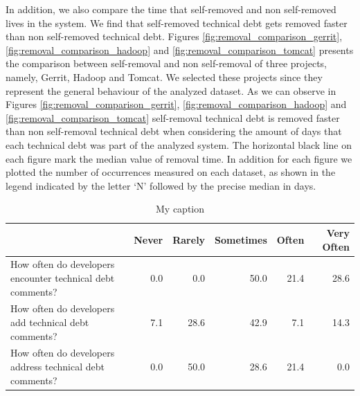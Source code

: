 In addition, we also compare the time that self-removed and non self-removed \SATD lives in the system. We find that self-removed technical debt gets removed faster than non self-removed technical debt. Figures \ref{fig:removal_comparison_gerrit}, \ref{fig:removal_comparison_hadoop} and \ref{fig:removal_comparison_tomcat} presents the comparison between self-removal and non self-removal of three projects, namely, Gerrit, Hadoop and Tomcat. We selected these projects since they represent the general behaviour of the analyzed dataset. As we can observe in Figures \ref{fig:removal_comparison_gerrit}, \ref{fig:removal_comparison_hadoop} and \ref{fig:removal_comparison_tomcat} self-removal technical debt is removed faster than non self-removal technical debt when considering the amount of days that each technical debt was part of the analyzed system. The horizontal black line on each figure mark the median value of removal time. In addition for each figure we plotted the number of occurrences measured on each dataset, as shown in the legend indicated by the letter `N' followed by the precise median in days.




\begin{table}[]
	\centering
	\caption{My caption}
	\label{my-label}
	\begin{tabular}{@{}lrrrrr@{}}
		\toprule
		\textbf{} & \textbf{Never} & \textbf{Rarely} & \textbf{Sometimes} & \textbf{Often} & \textbf{Very Often} \\ \midrule
		How often do developers encounter technical debt comments? & 0.0 & 0.0 & 50.0 & 21.4 & 28.6 \\
		How often do developers add technical debt comments? & 7.1 & 28.6 & 42.9 & 7.1 & 14.3 \\
		How often do developers address technical debt comments? & 0.0 & 50.0 & 28.6 & 21.4 & 0.0 \\ \bottomrule
	\end{tabular}
\end{table}




